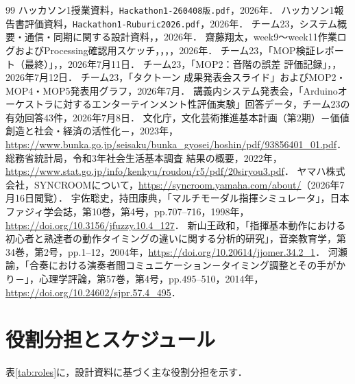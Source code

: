 \documentclass[uplatex,dvipdfmx]{jlreq}
\begin{document}
\begin{thebibliography}{99}
ハッカソン1授業資料，\texttt{Hackathon1-260408版.pdf}，2026年．
ハッカソン1報告書評価資料，\texttt{Hackathon1-Ruburic2026.pdf}，2026年．
チーム23，システム概要・通信・同期に関する設計資料，，2026年．
齋藤翔太，week9〜week11作業ログおよびProcessing確認用スケッチ，，，，2026年．
チーム23，「MOP検証レポート（最終）」，，2026年7月11日．
チーム23，「MOP2：音階の誤差 評価記録」，，2026年7月12日．
チーム23，「タクトーン 成果発表会スライド」およびMOP2・MOP4・MOP5発表用グラフ，2026年7月．
講義内システム発表会，「Arduinoオーケストラに対するエンターテインメント性評価実験」回答データ，チーム23の有効回答43件，2026年7月8日．
文化庁，文化芸術推進基本計画（第2期）－価値創造と社会・経済の活性化－，2023年，\url{https://www.bunka.go.jp/seisaku/bunka_gyosei/hoshin/pdf/93856401_01.pdf}．
総務省統計局，令和3年社会生活基本調査 結果の概要，2022年，\url{https://www.stat.go.jp/info/kenkyu/roudou/r5/pdf/20siryou3.pdf}．
ヤマハ株式会社，SYNCROOMについて，\url{https://syncroom.yamaha.com/about/}（2026年7月16日閲覧）．
宇佐聡史，持田康典，「マルチモーダル指揮シミュレータ」，日本ファジィ学会誌，第10巻，第4号，pp.707--716，1998年，\url{https://doi.org/10.3156/jfuzzy.10.4_127}．
新山王政和，「指揮基本動作における初心者と熟達者の動作タイミングの違いに関する分析的研究」，音楽教育学，第34巻，第2号，pp.1--12，2004年，\url{https://doi.org/10.20614/jjomer.34.2_1}．
河瀬諭，「合奏における演奏者間コミュニケーション－タイミング調整とその手がかり－」，心理学評論，第57巻，第4号，pp.495--510，2014年，\url{https://doi.org/10.24602/sjpr.57.4_495}．
\end{thebibliography}

\clearpage
\appendix
\setcounter{figure}{0}
\setcounter{table}{0}
\renewcommand{\thefigure}{A.\arabic{figure}}
\renewcommand{\thetable}{A.\arabic{table}}
\renewcommand{\theHfigure}{appendix.\arabic{figure}}
\renewcommand{\theHtable}{appendix.\arabic{table}}
\renewcommand{\theequation}{\Alph{section}.\arabic{equation}}

\section{役割分担とスケジュール}
表\ref{tab:roles}に，設計資料に基づく主な役割分担を示す．
\end{document}
